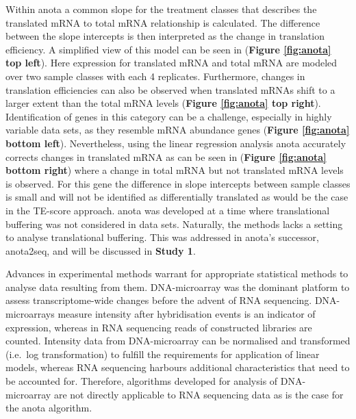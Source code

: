 \documentclass[12pt,openany]{book}
\begin{document}
Within anota a common slope for the treatment classes that describes the
translated mRNA to total mRNA relationship is calculated. The difference
between the slope intercepts is then interpreted as the change in
translation efficiency. A simplified view of this model can be seen in
(\textbf{Figure \ref{fig:anota} top left}). Here expression for
translated mRNA and total mRNA are modeled over two sample classes with
each 4 replicates. Furthermore, changes in translation efficiencies can
also be observed when translated mRNAs shift to a larger extent than the
total mRNA levels (\textbf{Figure \ref{fig:anota} top right}).
Identification of genes in this category can be a challenge, especially
in highly variable data sets, as they resemble mRNA abundance genes
(\textbf{Figure \ref{fig:anota} bottom left}). Nevertheless, using the
linear regression analysis anota accurately corrects changes in
translated mRNA as can be seen in (\textbf{Figure \ref{fig:anota} bottom
right}) where a change in total mRNA but not translated mRNA levels is
observed. For this gene the difference in slope intercepts between
sample classes is small and will not be identified as differentially
translated as would be the case in the TE-score approach. anota was
developed at a time where translational buffering was not considered in
data sets. Naturally, the methods lacks a setting to analyse
translational buffering. This was addressed in anota's successor,
anota2seq, and will be discussed in \textbf{Study 1}.

Advances in experimental methods warrant for appropriate statistical
methods to analyse data resulting from them. DNA-microarray was the
dominant platform to assess transcriptome-wide changes before the advent
of RNA sequencing. DNA-microarrays measure intensity after hybridisation
events is an indicator of expression, whereas in RNA sequencing reads of
constructed libraries are counted. Intensity data from DNA-microarray
can be normalised and transformed (i.e.~log transformation) to fulfill
the requirements for application of linear models, whereas RNA
sequencing harbours additional characteristics that need to be accounted
for. Therefore, algorithms developed for analysis of DNA- microarray are
not directly applicable to RNA sequencing data as is the case for the
anota algorithm.
\end{document}

